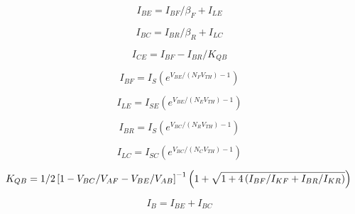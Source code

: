 \documentclass{article}
\begin{document}
\begin{equation}
I_{BE} = {{\textstyle I_{BF} } / {\textstyle \beta_F }} + I_{LE}
\end{equation}

\begin{equation}
I_{BC} = {{\textstyle I_{BR} } / {\textstyle \beta_R }} + I_{LC}
\end{equation}

\begin{equation}
I_{CE} = {{\textstyle I_{BF} - I_{BR} } / {\textstyle K_{QB} }}
\end{equation}

\begin{equation}
I_{BF} = I_S\left(e^{\textstyle V_{BE}/(N_F V_{TH}) - 1} \right)
\end{equation}

\begin{equation}
I_{LE}=I_{SE}\left(e^{\textstyle V_{BE}/(N_E V_{TH}) - 1} \right)
\end{equation}

\begin{equation}
I_{BR} = I_S\left(e^{\textstyle V_{BC}/(N_R V_{TH}) - 1} \right)
\end{equation}

\begin{equation}
I_{LC}=I_{SC}\left(e^{\textstyle V_{BC}/(N_C V_{TH}) - 1} \right)
\end{equation}

\begin{equation}
K_{QB} = {{\textstyle 1}/{2}} \left[1 -
{{\textstyle V_{BC}}/{\textstyle V_{AF}}}- {{\textstyle V_{BE}}/{\textstyle V_{AB}}}
    \right]^{-1} \left(1 + \sqrt{1 + 4\left(
        {{\textstyle I_{BF}}/{\textstyle I_{KF}}}+
         {{\textstyle I_{BR}}/{\textstyle I_{KR}}}
        \right)}\right)\\
\end{equation}

\begin{equation}
I_B = I_{BE}+I_{BC}
\end{equation}
\end{document}
